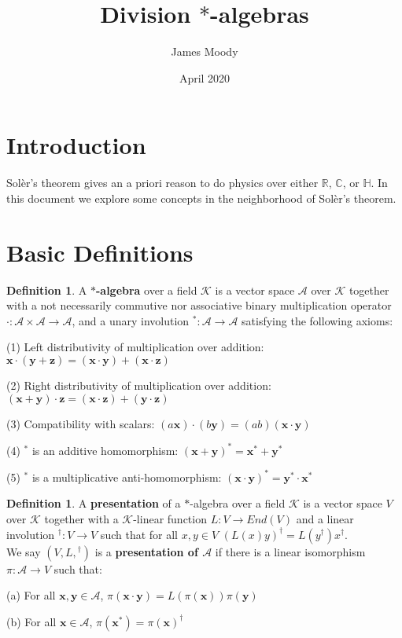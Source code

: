 \documentclass[12pt]{article}
\title{Division $*$-algebras}
\author{James Moody}
\date{April 2020}
\theoremstyle{definition}
\newtheorem{definition}[theorem]{Definition}
\theoremstyle{remark}
\begin{document}
\maketitle

\section*{Introduction} 

Sol\`{e}r's theorem gives an a priori reason to do physics over either \(\mathbb{R}\), \(\mathbb{C}\), or \(\mathbb{H}\). In this document we explore some concepts in the neighborhood of Sol\`{e}r's theorem. 

\section{Basic Definitions}

\begin{definition} A \textbf{$*$-algebra} over a field $\mathcal{K}$ is a vector space $\mathcal{A}$ over $\mathcal{K}$ together with a not necessarily commutive nor associative binary multiplication operator $\cdot: \mathcal{A} \times \mathcal{A} \rightarrow \mathcal{A}$, and a unary involution $^*:\mathcal{A} \rightarrow \mathcal{A}$ satisfying the following axioms:

(1) Left distributivity of multiplication over addition: $\mathbf{x} \cdot (\mathbf{y} + \mathbf{z}) = (\mathbf{x} \cdot \mathbf{y}) + (\mathbf{x} \cdot \mathbf{z})$

(2) Right distributivity of multiplication over addition: $(\mathbf{x}+\mathbf{y}) \cdot \mathbf{z} = (\mathbf{x} \cdot \mathbf{z}) + (\mathbf{y} \cdot \mathbf{z})$

(3) Compatibility with scalars: $(a\mathbf{x}) \cdot (b \mathbf{y}) = (ab)(\mathbf{x} \cdot \mathbf{y})$

(4) $^*$ is an additive homomorphism: $(\mathbf{x}+\mathbf{y})^* = \mathbf{x}^* + \mathbf{y}^*$

(5) $^*$ is a multiplicative anti-homomorphism: $(\mathbf{x} \cdot \mathbf{y})^* = \mathbf{y}^* \cdot \mathbf{x}^*$
\end{definition}

\begin{definition} A \textbf{presentation} of a $*$-algebra over a field $\mathcal{K}$ is a vector space $V$ over \(\mathcal{K}\) together with a $\mathcal{K}$-linear function $L: V \rightarrow End(V)$ and a linear involution $^{\dagger} : V \rightarrow V$ such that for all \(x,y \in V\) $(L(x)y)^{\dagger} = L(y^{\dagger}) x^{\dagger}$.\\

\noindent We say \((V, L, {}^\dagger)\) is a \textbf{presentation of \(\mathcal{A}\)} if there is a linear isomorphism \(\pi: \mathcal{A} \rightarrow V\) such that:

(a) For all $\mathbf{x}, \mathbf{y} \in \mathcal{A}$, $\pi(\mathbf{x} \cdot \mathbf{y}) = L(\pi(\mathbf{x})) \pi(\mathbf{y})$ 

(b) For all $\mathbf{x} \in \mathcal{A}$, $\pi(\mathbf{x}^*) = \pi(\mathbf{x})^{\dagger}$
\end{definition} 
\end{document}
